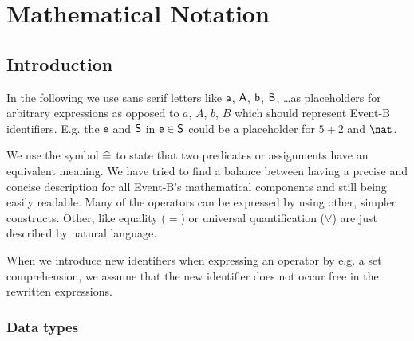 \section{Mathematical Notation}
\label{mathematical_notation}

\subsection{Introduction}
\label{mathematical_notation_introduction}

In the following we use sans serif letters like $\textsf{a}$, $\textsf{A}$, $\textsf{b}$, $\textsf{B}$, \ldots as
placeholders for arbitrary expressions as opposed to $a$, $A$, $b$, $B$ which should represent
Event-B identifiers.
E.g. the $\textsf{e}$ and $\textsf{S}$ in $\textsf{e}\in\textsf{S}$ could be a placeholder for $5+2$ and $\nat$.

We use the symbol $\mathrel{\widehat=}$ to state that two predicates or assignments have an equivalent meaning.
We have tried to find a balance between having a precise and concise description for all Event-B's
mathematical components and still being easily readable.
Many of the operators can be expressed by using other, simpler constructs.
Other, like equality ($=$) or universal quantification ($\forall$) are just described by natural language.

When we introduce new identifiers when expressing an operator by e.g. a set comprehension, we assume
that the new identifier does not occur free in the rewritten expressions.


\subsubsection{Data types}
\label{data_types}

